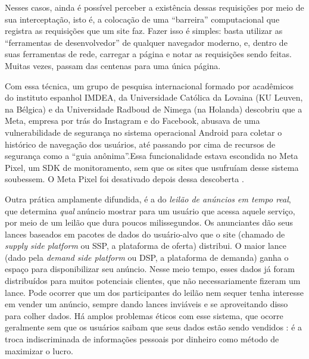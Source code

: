 Nesses casos, ainda é possível perceber a existência dessas requisições por meio de sua interceptação, isto é, a colocação de uma ``barreira'' computacional que registra as requisições que um site faz.
Fazer isso é simples: basta utilizar as ``ferramentas de desenvolvedor'' de qualquer navegador moderno, e, dentro de suas ferramentas de rede, carregar a página e notar as requisições sendo feitas.
Muitas vezes, passam das centenas para uma única página.

Com essa técnica, um grupo de pesquisa internacional formado por acadêmicos do instituto espanhol IMDEA, da Universidade Católica da Lovaina (KU Leuven, na Bélgica) e da Universidade Radboud de Nimega (na Holanda) descobriu que a Meta, empresa por trás do Instagram e do Facebook, abusava de uma vulnerabilidade de segurança no sistema operacional Android para coletar o histórico de navegação dos usuários, até passando por cima de recursos de segurança como a ``guia anônima''.Essa funcionalidade estava escondida no Meta Pixel, um SDK de monitoramento, sem que os sites que usufruíam desse sistema soubessem. 
O Meta Pixel foi desativado depois dessa descoberta \cite{girish_disclosure_2025}.

Outra prática amplamente difundida, é a do \textit{leilão de anúncios em tempo real}, que determina \textit{qual} anúncio mostrar para um usuário que acessa aquele serviço, por meio de um leilão que dura poucos milissegundos.
Os anunciantes dão seus lances baseados em pacotes de dados do usuário-alvo que o site (chamado de \textit{supply side platform} ou SSP, a plataforma de oferta) distribui.
O maior lance (dado pela \textit{demand side platform} ou DSP, a plataforma de demanda) ganha o espaço para disponibilizar seu anúncio.
Nesse meio tempo, esses dados já foram distribuídos para muitos potenciais clientes, que não necessariamente fizeram um lance.
Pode ocorrer que um dos participantes do leilão nem sequer tenha interesse em vender um anúncio, sempre dando lances inviáveis e se aproveitando disso para colher dados.
Há amplos problemas éticos com esse sistema, que ocorre geralmente sem que os usuários saibam que seus dados estão sendo vendidos \cite{bashir_privacy_2019}: é a troca indiscriminada de informações pessoais por dinheiro como método de maximizar o lucro.


